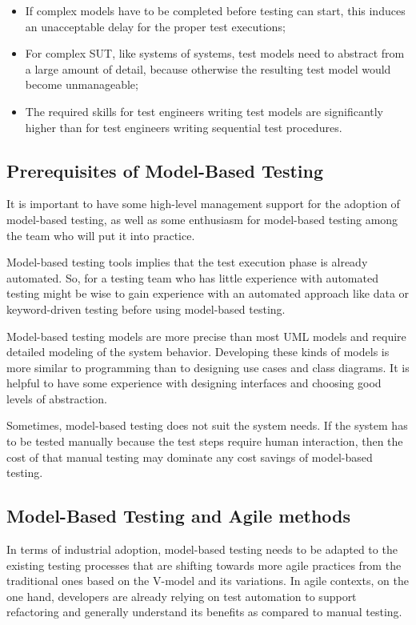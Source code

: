 \begin{itemize}
\item If complex models have to be completed before testing
can start, this induces an unacceptable delay for the
proper test executions;
\item For complex SUT, like systems of systems, test models 
need to abstract from a large amount of detail, because 
otherwise the resulting test model would become unmanageable;
\item The required skills for test engineers writing test 
models are significantly higher than for test engineers 
writing sequential test procedures.
\end{itemize}

\subsection{Prerequisites of Model-Based Testing}

It is important to have some high-level management support for the adoption of model-based testing, as well as some enthusiasm for model-based testing among the team who will put it into practice.

Model-based testing tools implies that the test execution phase is already automated. So, for a testing team who has little experience with automated testing might be wise to gain experience with an automated approach like data or keyword-driven testing before using model-based testing.

Model-based testing models are more precise than most UML models and require detailed modeling of the system behavior. Developing these kinds of models is more similar to programming than to designing use cases and class diagrams. It is helpful to have some experience with designing interfaces and choosing good levels of abstraction.

Sometimes, model-based testing does not suit the system needs. If the system has to be tested manually because the test steps require human interaction, then the cost of that manual testing may dominate any cost savings of model-based testing.

\subsection{Model-Based Testing and Agile methods}

In terms of industrial adoption, model-based testing needs to be adapted to the
existing testing processes that are shifting towards more agile practices
from the traditional ones based on the V-model and its variations. In agile
contexts, on the one hand, developers are already relying on test automation to
support refactoring and generally understand its benefits as compared to manual
testing.

